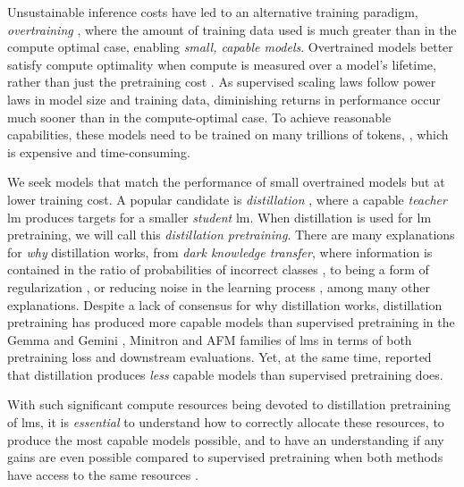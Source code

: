 Unsustainable inference costs have led to an alternative training paradigm, \emph{overtraining} \citep{DBLP:journals/corr/abs-2403-08540},
where the amount of training data used is much greater than in the compute optimal case,
enabling \emph{small, capable models}.
Overtrained models better satisfy compute optimality when compute is measured over a model's lifetime, rather than just the pretraining cost \citep{DBLP:conf/icml/SardanaPDF24}.
As supervised scaling laws follow power laws in model size and training data, diminishing returns in performance occur much sooner than in the compute-optimal case. To achieve reasonable capabilities, these models need to be trained on many trillions of tokens,
\citep{DBLP:journals/corr/abs-2408-03314,DBLP:journals/corr/abs-2407-21787,DBLP:journals/corr/abs-2408-00724}, which is expensive and time-consuming.

We seek models that match the performance of small overtrained models but at lower training cost. 
A popular candidate is \emph{distillation} \citep{DBLP:journals/corr/HintonVD15}, where a capable \emph{teacher} \gls{lm} produces targets for a smaller \emph{student} \gls{lm}.
When distillation is used for \gls{lm} pretraining, we will call this \emph{distillation pretraining}.
There are many explanations for \emph{why} distillation works,
from \emph{dark knowledge transfer},
where information is contained in the ratio of probabilities of incorrect classes \citep{DBLP:journals/corr/HintonVD15},
to being a form of regularization \citep{DBLP:conf/nips/MobahiFB20},
or reducing noise in the learning process \citep{DBLP:journals/corr/abs-2005-10419}, among many other explanations.
Despite a lack of consensus for why distillation works,
distillation pretraining has produced more capable models than supervised pretraining in the Gemma and Gemini \citep{DBLP:journals/corr/abs-2408-00118}, Minitron \citep{DBLP:journals/corr/abs-2407-14679,DBLP:journals/corr/abs-2408-11796} and AFM  \citep{DBLP:journals/corr/abs-2407-21075} families of \glspl{lm} in terms of both pretraining loss and downstream evaluations.
Yet, at the same time, \citet{DBLP:conf/icml/Liu0ILTFXCSKLC24} reported that distillation produces \emph{less} capable models than supervised pretraining does.

With such significant compute resources being devoted to distillation pretraining of \glspl{lm},
it is \emph{essential} to understand how to correctly allocate these resources, to produce the most capable models possible,
and to have an understanding if any gains are even possible
compared to supervised pretraining when both methods have access to the same resources \citep{DBLP:journals/corr/abs-2110-12894}.

